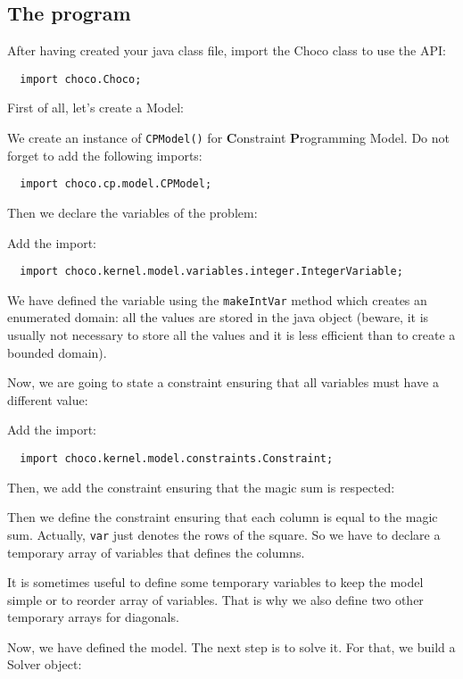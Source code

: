\subsection{The program}\label{introduction:theprogram}\hypertarget{introduction:theprogram}{}
After having created your java class file, import the Choco class to use the API:
\begin{lstlisting}
  import choco.Choco;
\end{lstlisting}
First of all, let's create a Model:

We create an instance of \texttt{CPModel()} for \textbf{C}onstraint \textbf{P}rogramming Model.
Do not forget to add the following imports:
\begin{lstlisting}
  import choco.cp.model.CPModel;
\end{lstlisting}
Then we declare the variables of the problem:

Add the import:
\begin{lstlisting}
  import choco.kernel.model.variables.integer.IntegerVariable;
\end{lstlisting}
We have defined the variable using the \texttt{makeIntVar} method which creates an enumerated domain: all the values are stored in the java object (beware, it is usually not necessary to store all the values and it is less efficient than to create a bounded domain).

\noindent Now, we are going to state a constraint ensuring that all variables must have a different value:

Add the import:
\begin{lstlisting}
  import choco.kernel.model.constraints.Constraint;
\end{lstlisting}
Then, we add the constraint ensuring that the magic sum is respected:

Then we define the constraint ensuring that each column is equal to the magic sum.
Actually, \texttt{var} just denotes the rows of the square. So we have to declare a temporary array of variables that defines the columns.

It is sometimes useful to define some temporary variables to keep the model simple or to reorder array of variables. That is why we also define two other temporary arrays for diagonals.

Now, we have defined the model. The next step is to solve it.
For that, we build a Solver object:


